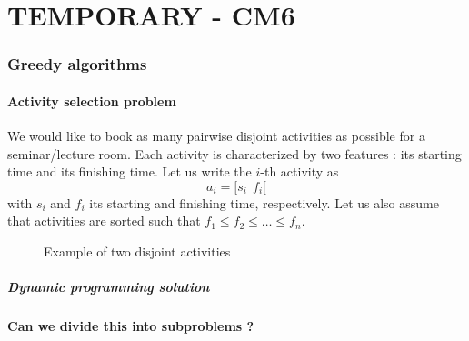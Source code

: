 \part*{TEMPORARY - CM6}

\section{Greedy algorithms}

\subsection{Activity selection problem} 
We would like to book as many pairwise disjoint activities as possible for a seminar/lecture room.
Each activity is characterized by two features : its starting time and its finishing time. Let us write the $i$-th activity as
\begin{equation*}
a_i = [s_i \: \:  f_i[
\end{equation*}
with $s_i$ and $f_i$ its starting and finishing time, respectively. Let us also assume that activities are sorted such that $f_1 \leq f_2 \leq \ldots \leq f_n$.

\begin{figure}[h!]
\centering
{}
\caption{Example of two disjoint activities}
\end{figure}

\subsubsection{Dynamic programming solution}
\subsection*{Can we divide this into subproblems ?}

